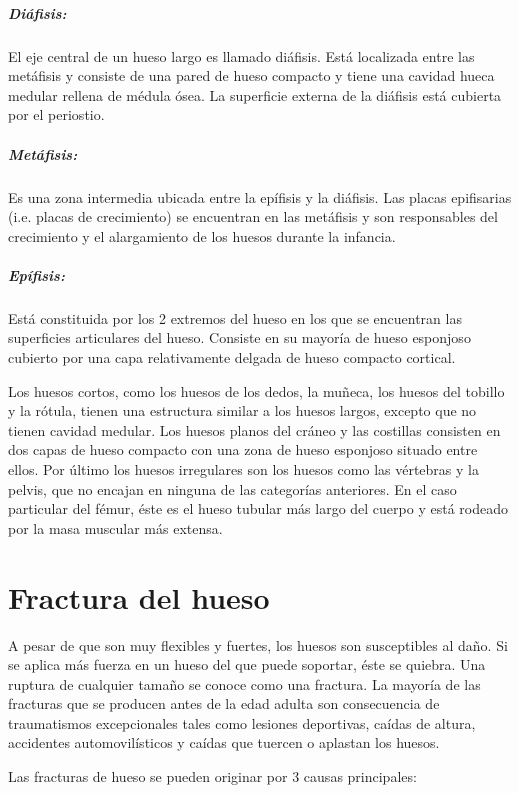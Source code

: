 \subparagraph{Di\'afisis:}El eje central de un hueso largo es llamado di\'afisis. Est\'a localizada entre las met\'afisis y consiste de una pared de hueso compacto y tiene una cavidad hueca medular rellena de m\'edula \'osea. La superficie externa de la di\'afisis est\'a cubierta por el periostio.

\subparagraph{Met\'afisis:}Es una zona intermedia ubicada entre la ep\'ifisis y la di\'afisis. Las placas epifisarias (i.e. placas de crecimiento) se encuentran en las met\'afisis y son responsables del crecimiento y el alargamiento de los huesos durante la infancia.

\subparagraph{Ep\'ifisis:}Est\'a constituida por los 2 extremos del hueso en los que se encuentran las superficies articulares del hueso. Consiste en su mayor\'ia de hueso esponjoso cubierto por una capa relativamente delgada de hueso compacto cortical.

Los huesos cortos, como los huesos de los dedos, la mu\~neca, los huesos del tobillo y la r\'otula, tienen una estructura similar a los huesos largos, excepto que no tienen cavidad medular. Los huesos planos del cr\'aneo y las costillas consisten en dos capas de hueso compacto con una zona de hueso esponjoso situado entre ellos. Por \'ultimo los huesos irregulares son los huesos como las v\'ertebras y la pelvis, que no encajan en ninguna de las categor\'ias anteriores. En el caso particular del f\'emur, \'este es el hueso tubular m\'as largo del cuerpo y est\'a rodeado por la masa muscular m\'as extensa.

\section{Fractura del hueso}

A pesar de que son muy flexibles y fuertes, los huesos son susceptibles al da\~no. Si se aplica m\'as fuerza en un hueso del que puede soportar, \'este se quiebra. Una ruptura de cualquier tama\~no se conoce como una fractura. La mayor\'ia de las fracturas que se producen antes de la edad adulta son consecuencia de traumatismos excepcionales tales como lesiones deportivas, ca\'idas de altura, accidentes automovil\'isticos y ca\'idas que tuercen o aplastan los huesos.

Las fracturas de hueso se pueden originar por 3 causas principales:

